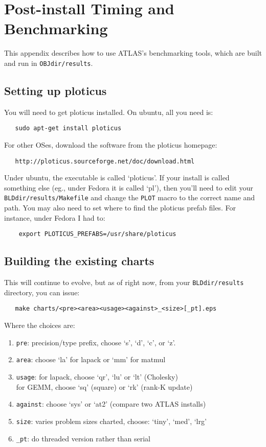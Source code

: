 \documentclass[11pt]{article}
\begin{document}


\newpage
\appendix

\section{Post-install Timing and Benchmarking}

This appendix describes how to use ATLAS's benchmarking tools, which are
built and run in {\tt OBJdir/results}.

\subsection{Setting up ploticus}
You will need to get ploticus installed.  On ubuntu, all you need is:
\begin{verbatim}
   sudo apt-get install ploticus
\end{verbatim}

For other OSes, download the software from the ploticus homepage:
\begin{verbatim}
   http://ploticus.sourceforge.net/doc/download.html
\end{verbatim}

Under ubuntu, the executable is called `ploticus'.  If your install
is called something else (eg., under Fedora it is called `pl'), then
you'll need to edit your {\tt BLDdir/results/Makefile} and change the
{\tt PLOT} macro to the correct name and path.  You may also need
to set where to find the ploticus prefab files.  For instance, under
Fedora I had to:
\begin{verbatim}
    export PLOTICUS_PREFABS=/usr/share/ploticus
\end{verbatim}

\subsection{Building the existing charts}
\label{sec-excharts}
This will continue to evolve, but as of right now, from your
{\tt BLDdir/results} directory, you can issue:
\begin{verbatim}
   make charts/<pre><area><usage><against>_<size>[_pt].eps
\end{verbatim}
Where the choices are:
\begin{enumerate}
\item \verb+pre+: precision/type prefix, choose `s', `d', `c', or `z'.
\item \verb+area+: choose `la' for lapack or `mm' for matmul
\item \verb+usage+: for lapack, choose `qr', `lu' or `lt' (Cholesky) \\
                    for GEMM, choose `sq' (square) or `rk' (rank-K update)
\item \verb+against+: choose `sys' or `at2' (compare two ATLAS installs)
\item \verb+size+: varies problem sizes charted, choose: `tiny', `med', `lrg'
\item \verb+_pt+: do threaded version rather than serial
\end{enumerate}
\end{document}
